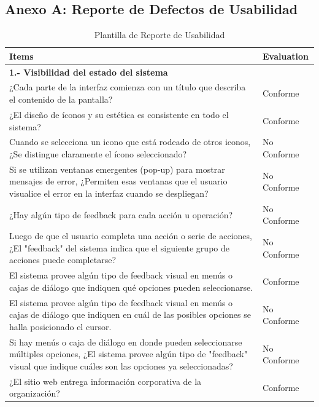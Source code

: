 \documentclass[stu, 12pt, letterpaper, donotrepeattitle, floatsintext, natbib]{apa7}
\begin{document}
\subsection{Anexo A: Reporte de Defectos de Usabilidad} \label{tab:reporte_usabilidad}

\begin{longtable}{|>{\raggedright\arraybackslash}p{10cm}|>{\centering\arraybackslash}p{3cm}|}
    \caption{Plantilla de Reporte de Usabilidad} \label{tab:reporte_usabilidad} \\
    \hline
    \textbf{Items} & \textbf{Evaluation} \\ \hline
    
    \textbf{1.- Visibilidad del estado del sistema} & \\ \hline
    ¿Cada parte de la interfaz comienza con un título que describa el contenido de la pantalla? & Conforme \\ \hline
    ¿El diseño de íconos y su estética es consistente en todo el sistema? & Conforme \\ \hline
    Cuando se selecciona un icono que está rodeado de otros iconos, ¿Se distingue claramente el ícono seleccionado? & No Conforme \\ \hline
    Si se utilizan ventanas emergentes (pop-up) para mostrar mensajes de error, ¿Permiten esas ventanas que el usuario visualice el error en la interfaz cuando se despliegan? & No Conforme\\ \hline
    ¿Hay algún tipo de feedback para cada acción u operación? & No Conforme\\ \hline
    Luego de que el usuario completa una acción o serie de acciones, ¿El "feedback" del sistema indica que el siguiente grupo de acciones puede completarse? & No Conforme\\ \hline
    El sistema provee algún tipo de feedback visual en menús o cajas de diálogo que indiquen qué opciones pueden seleccionarse. & Conforme \\ \hline
    El sistema provee algún tipo de feedback visual en menús o cajas de diálogo que indiquen en cuál de las posibles opciones se halla posicionado el cursor. & No Conforme \\ \hline
    Si hay menús o caja de diálogo en donde pueden seleccionarse múltiples opciones, ¿El sistema provee algún tipo de "feedback" visual que indique cuáles son las opciones ya seleccionadas? & No Conforme \\ \hline
    ¿El sitio web entrega información corporativa de la organización? & Conforme \\ \hline

\end{longtable}
\end{document}

